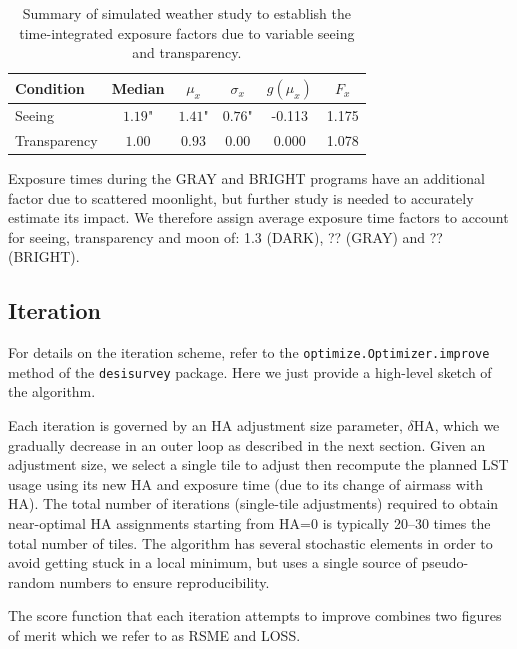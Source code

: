\documentclass[12pt]{article}
\begin{document}
\begin{table}[htb]
\begin{center}
\begin{tabular}{lccccc}
Condition & Median & $\mu_x$ & $\sigma_x$ & $g(\mu_x)$ & $F_x$ \\
\hline
Seeing & $1.19$" & $1.41$" & $0.76$" & -0.113 & 1.175 \\
Transparency & $1.00$ & $0.93$ & $0.00$ & 0.000 & 1.078 \\
\hline
\end{tabular}
\caption{Summary of simulated weather study to establish the time-integrated exposure factors due to variable seeing and transparency.}
\label{tab:expfac}
\end{center}
\end{table}

Exposure times during the GRAY and BRIGHT programs have an additional factor due to scattered moonlight, but further study is needed to accurately estimate its impact.  We therefore assign average exposure time factors to account for seeing, transparency and moon of: 1.3 (DARK), ?? (GRAY) and ?? (BRIGHT).

\subsection{Iteration}

For details on the iteration scheme, refer to the {\tt optimize.Optimizer.improve} method of the {\tt desisurvey} package. Here we just provide a high-level sketch of the algorithm.

Each iteration is governed by an HA adjustment size parameter, $\delta\text{HA}$, which we gradually decrease in an outer loop as described in the next section. Given an adjustment size, we select a single tile to adjust then recompute the planned LST usage using its new HA and exposure time (due to its change of airmass with HA). The total number of iterations (single-tile adjustments) required to obtain near-optimal HA assignments starting from HA=0 is typically 20--30 times the total number of tiles. The algorithm has several stochastic elements in order to avoid getting stuck in a local minimum, but uses a single source of pseudo-random numbers to ensure reproducibility.

The score function that each iteration attempts to improve combines two figures of merit which we refer to as RSME and LOSS.
\end{document}

